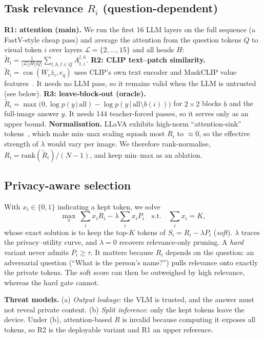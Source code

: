 \documentclass[10pt]{article}
\newcommand{\R}{R}
\renewcommand{\Pr}{P}
\begin{document}
\subsection{Task relevance $\R_i$ (question-dependent)}
\textbf{R1: attention (main).} We run the first 16 LLM layers on the full sequence (a FastV-style cheap pass) and average the attention
from the question tokens $Q$ to visual token $i$ over layers $\mathcal L=\{2,\dots,15\}$ and all heads $H$:
$\tilde \R_i=\frac{1}{|\mathcal L||H||Q|}\sum_{l,h,t\in Q}A^{l,h}_{t,i}$.
\textbf{R2: CLIP text--patch similarity.} $\tilde\R_i=\cos(W_v \hat z_i, e_q)$ uses CLIP's own text encoder and MaskCLIP value features~\cite{zhou2022maskclip}.
It needs no LLM pass, so it remains valid when the LLM is untrusted (see below).
\textbf{R3: leave-block-out (oracle).} $\tilde\R_i=\max\!\big(0,\log p(y\,|\,\text{all})-\log p(y\,|\,\text{all}\setminus b(i))\big)$
for $2{\times}2$ blocks $b$ and the full-image answer $y$. It needs 144 teacher-forced passes, so it serves only as an upper bound.
\textbf{Normalisation.} LLaVA exhibits high-norm ``attention-sink'' tokens~\cite{darcet2024registers}, which make min--max scaling squash most $\R_i$ to ${\approx}0$,
so the effective strength of $\lambda$ would vary per image. We therefore rank-normalise, $\R_i=\mathrm{rank}(\tilde\R_i)/(N-1)$, and keep min--max as an ablation.

\subsection{Privacy-aware selection}
With $x_i\in\{0,1\}$ indicating a kept token, we solve
\begin{equation}
\max_{x}\ \sum_i x_i\R_i-\lambda\sum_i x_i\Pr_i\quad\text{s.t.}\quad \sum_i x_i=K,
\end{equation}
whose exact solution is to keep the top-$K$ tokens of $S_i=\R_i-\lambda\Pr_i$ (\emph{soft}). $\lambda$ traces the privacy--utility curve,
and $\lambda=0$ recovers relevance-only pruning. A \emph{hard} variant never admits $\Pr_i\ge\tau$.
It matters because $\R_i$ depends on the question: an adversarial question (``What is the person's name?'') pulls relevance onto exactly the private tokens.
The soft score can then be outweighed by high relevance, whereas the hard gate cannot.

\textbf{Threat models.} (a) \emph{Output leakage}: the VLM is trusted, and the answer must not reveal private content.
(b) \emph{Split inference}: only the kept tokens leave the device. Under (b), attention-based $\R$ is invalid because computing it exposes all tokens,
so R2 is the deployable variant and R1 an upper reference.
\end{document}

